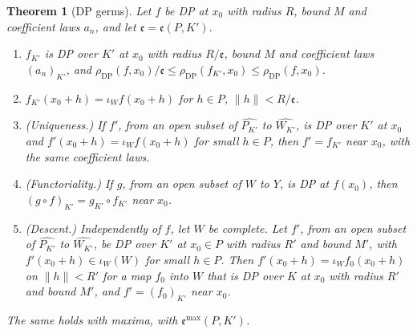 \documentclass[11pt]{amsart}
\newtheorem{theorem}{Theorem}[section]
\theoremstyle{definition}
\theoremstyle{remark}
\numberwithin{equation}{section}
\newcommand{\norm}[1]{\lVert #1\rVert}
\theoremstyle{plain}
\theoremstyle{definition}
\theoremstyle{plain}
\begin{document}
\begin{theorem}[DP germs]\label{dp:thm:germ-base-change}
Let $f$ be DP at $x_0$ with radius $R$, bound $M$ and coefficient laws $a_n$, and let $\mathfrak e=\mathfrak e(P,K')$.
\begin{enumerate}
\item $f_{K'}$ is DP over $K'$ at $x_0$ with radius $R/\mathfrak e$, bound $M$ and coefficient laws $(a_n)_{K'}$, and $\rho_{\mathrm{DP}}(f,x_0)/\mathfrak e\le\rho_{\mathrm{DP}}(f_{K'},x_0)\le\rho_{\mathrm{DP}}(f,x_0)$.
\item $f_{K'}(x_0+h)=\iota_Wf(x_0+h)$ for $h\in P$, $\norm h<R/\mathfrak e$.
\item \textup{(Uniqueness.)} If $f'$, from an open subset of $\widehat{P_{K'}}$ to $\widehat{W_{K'}}$, is DP over $K'$ at $x_0$ and $f'(x_0+h)=\iota_Wf(x_0+h)$ for small $h\in P$, then $f'=f_{K'}$ near $x_0$, with the same coefficient laws.
\item \textup{(Functoriality.)} If $g$, from an open subset of $W$ to $Y$, is DP at $f(x_0)$, then $(g\circ f)_{K'}=g_{K'}\circ f_{K'}$ near $x_0$.
\item \textup{(Descent.)} Independently of $f$, let $W$ be complete. Let $f'$, from an open subset of $\widehat{P_{K'}}$ to $\widehat{W_{K'}}$, be DP over $K'$ at $x_0\in P$ with radius $R'$ and bound $M'$, with $f'(x_0+h)\in\iota_W(W)$ for small $h\in P$. Then $f'(x_0+h)=\iota_Wf_0(x_0+h)$ on $\norm h<R'$ for a map $f_0$ into $W$ that is DP over $K$ at $x_0$ with radius $R'$ and bound $M'$, and $f'=(f_0)_{K'}$ near $x_0$.
\end{enumerate}
The same holds with maxima, with $\mathfrak e^{\max}(P,K')$.
\end{theorem}
\end{document}
